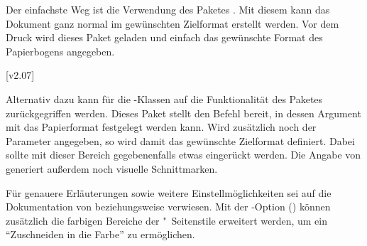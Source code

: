 Der einfachste Weg ist die Verwendung des Paketes . Mit diesem 
kann das Dokument ganz normal im gewünschten Zielformat erstellt werden. Vor 
dem Druck wird dieses Paket geladen und einfach das gewünschte Format des 
Papierbogens angegeben. 
%
\begin{quoting}[rightmargin=0pt]
\end{quoting}
%
[v2.07]%
\begin{Entity}{}
Alternativ dazu kann für die \TUDScript-Klassen auf die Funktionalität des 
Paketes  zurückgegriffen werden. Dieses Paket stellt den 
Befehl  bereit, in dessen Argument mit
 das Papierformat festgelegt 
werden kann. Wird zusätzlich noch der Parameter 
 angegeben, so wird damit das 
gewünschte Zielformat definiert. Dabei sollte mit 
 dieser Bereich gegebenenfalls 
etwas eingerückt werden. Die Angabe von 
 generiert außerdem noch visuelle 
Schnittmarken.
\end{Entity}
%
\begin{quoting}[rightmargin=0pt]
\end{quoting}
%
Für genauere Erläuterungen sowie weitere Einstellmöglichkeiten sei auf die 
Dokumentation von  beziehungsweise  verwiesen.
Mit der \TUDScript-Option () können
zusätzlich die farbigen Bereiche der "~Seitenstile 
erweitert werden, um ein \enquote{Zuschneiden in die Farbe} zu ermöglichen.



